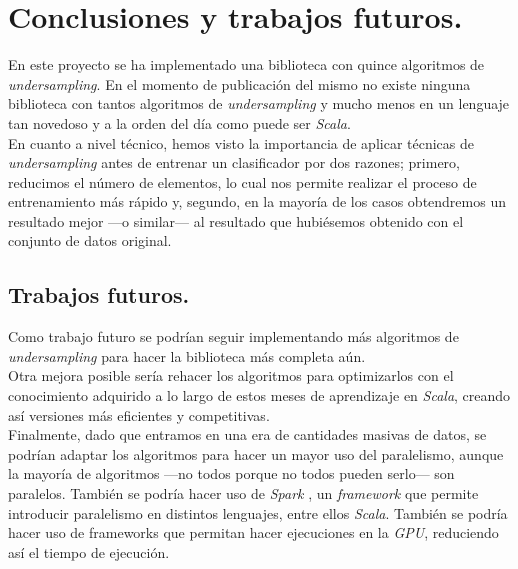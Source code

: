 \chapter{Conclusiones y trabajos futuros.} \label{ch:conclusion}

En este proyecto se ha implementado una biblioteca con quince algoritmos de \textit{undersampling}. En el momento de publicación del mismo no existe ninguna biblioteca con tantos algoritmos de \textit{undersampling} y mucho menos en un lenguaje tan novedoso y a la orden del día como puede ser \textit{Scala}. \\

En cuanto a nivel técnico, hemos visto la importancia de aplicar técnicas de \textit{undersampling} antes de entrenar un clasificador por dos razones; primero, reducimos el número de elementos, lo cual nos permite realizar el proceso de entrenamiento más rápido y, segundo, en la mayoría de los casos obtendremos un resultado mejor —o similar— al resultado que hubiésemos obtenido con el conjunto de datos original.

\section{Trabajos futuros.} \label{sec:trabajos_futuros.}

Como trabajo futuro se podrían seguir implementando más algoritmos de \textit{undersampling} para hacer la biblioteca más completa aún. \\

Otra mejora posible sería rehacer los algoritmos para optimizarlos con el conocimiento adquirido a lo largo de estos meses de aprendizaje en \textit{Scala}, creando así versiones más eficientes y competitivas. \\

Finalmente, dado que entramos en una era de cantidades masivas de datos, se podrían adaptar los algoritmos para hacer un mayor uso del paralelismo, aunque la mayoría de algoritmos —no todos porque no todos pueden serlo— son paralelos. También se podría hacer uso de \textit{Spark} \cite{spark} \cite{sparkweb}, un \textit{framework} que permite introducir paralelismo en distintos lenguajes, entre ellos \textit{Scala}. También se podría hacer uso de frameworks que permitan hacer ejecuciones en la \textit{GPU}, reduciendo así el tiempo de ejecución.